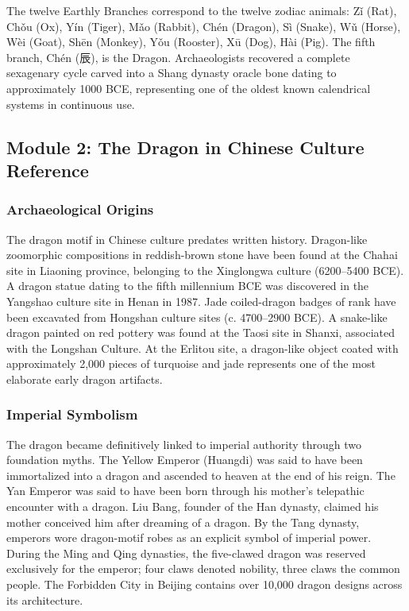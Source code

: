 \documentclass[11pt,letterpaper]{article}
\begin{document}
The twelve Earthly Branches correspond to the twelve zodiac animals: Zǐ (Rat), Chǒu (Ox), Yín (Tiger), Mǎo (Rabbit), Chén (Dragon), Sì (Snake), Wǔ (Horse), Wèi (Goat), Shēn (Monkey), Yǒu (Rooster), Xū (Dog), Hài (Pig). The fifth branch, Chén (辰), is the Dragon. Archaeologists recovered a complete sexagenary cycle carved into a Shang dynasty oracle bone dating to approximately 1000 BCE, representing one of the oldest known calendrical systems in continuous use.

\subsection{Module 2: The Dragon in Chinese Culture Reference}

\subsubsection{Archaeological Origins}

The dragon motif in Chinese culture predates written history. Dragon-like zoomorphic compositions in reddish-brown stone have been found at the Chahai site in Liaoning province, belonging to the Xinglongwa culture (6200--5400 BCE). A dragon statue dating to the fifth millennium BCE was discovered in the Yangshao culture site in Henan in 1987. Jade coiled-dragon badges of rank have been excavated from Hongshan culture sites (c. 4700--2900 BCE). A snake-like dragon painted on red pottery was found at the Taosi site in Shanxi, associated with the Longshan Culture. At the Erlitou site, a dragon-like object coated with approximately 2,000 pieces of turquoise and jade represents one of the most elaborate early dragon artifacts.

\subsubsection{Imperial Symbolism}

The dragon became definitively linked to imperial authority through two foundation myths. The Yellow Emperor (Huangdi) was said to have been immortalized into a dragon and ascended to heaven at the end of his reign. The Yan Emperor was said to have been born through his mother's telepathic encounter with a dragon. Liu Bang, founder of the Han dynasty, claimed his mother conceived him after dreaming of a dragon. By the Tang dynasty, emperors wore dragon-motif robes as an explicit symbol of imperial power. During the Ming and Qing dynasties, the five-clawed dragon was reserved exclusively for the emperor; four claws denoted nobility, three claws the common people. The Forbidden City in Beijing contains over 10,000 dragon designs across its architecture.
\end{document}
